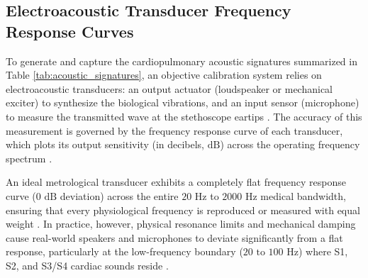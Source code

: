 \subsection{Electroacoustic Transducer Frequency Response Curves}

To generate and capture the cardiopulmonary acoustic signatures summarized in Table \ref{tab:acoustic_signatures}, an objective calibration system relies on electroacoustic transducers: an output actuator (loudspeaker or mechanical exciter) to synthesize the biological vibrations, and an input sensor (microphone) to measure the transmitted wave at the stethoscope eartips \cite{leng2015electronic, klum2019validation}. The accuracy of this measurement is governed by the frequency response curve of each transducer, which plots its output sensitivity (in decibels, $\text{dB}$) across the operating frequency spectrum \cite{eargle2004microphone, ballou2015handbook}.

An ideal metrological transducer exhibits a completely flat frequency response curve ($0\text{ dB}$ deviation) across the entire $20\text{ Hz}$ to $2000\text{ Hz}$ medical bandwidth, ensuring that every physiological frequency is reproduced or measured with equal weight \cite{klum2019validation, eargle2004microphone}. In practice, however, physical resonance limits and mechanical damping cause real-world speakers and microphones to deviate significantly from a flat response, particularly at the low-frequency boundary ($20\text{ to }100\text{ Hz}$) where S1, S2, and S3/S4 cardiac sounds reside \cite{leng2015electronic, ballou2015handbook}.

